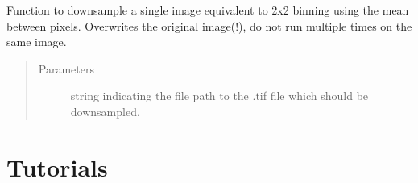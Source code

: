 \documentclass[a4paper,10pt,english,openany,oneside]{sphinxmanual}
\begin{document}
\begin{fulllineitems}
\label{\detokenize{pages/modules:vipertools.image_processing.downsample_img}}
\sphinxAtStartPar
Function to downsample a single image equivalent to 2x2 binning using the mean between pixels.
Overwrites the original image(!), do not run multiple times on the same image.
\begin{quote}\begin{description}
\item[{Parameters}] \leavevmode
\sphinxAtStartPar
{} \textendash{} string indicating the file path to the .tif file which should be downsampled.

\end{description}\end{quote}

\end{fulllineitems}



\chapter{Tutorials}
\label{\detokenize{pages/tutorials:tutorials}}\label{\detokenize{pages/tutorials::doc}}
\end{document}
